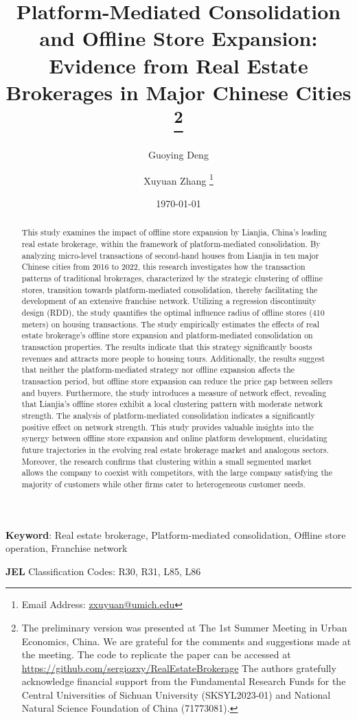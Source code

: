 \documentclass[11pt]{article}
\title{ \vspace*{-2.5cm} \hspace*{-0.5cm}Platform-Mediated Consolidation and Offline Store Expansion: Evidence from Real Estate Brokerages in Major Chinese Cities \footnote{
The preliminary version was presented at The 1st Summer Meeting in Urban Economics, China. We are grateful for the comments and suggestions made at the meeting. The code to replicate the paper can be accessed at \href{https://github.com/sergiozxy/RealEstateBrokerage}{https://github.com/sergiozxy/RealEstateBrokerage} The authors gratefully acknowledge financial support from the Fundamental Research Funds for the Central Universities of Sichuan University (SKSYL2023-01) and National Natural Science Foundation of China (71773081). %
}}
\date{ \vspace*{0.5cm} \today}
\begin{document}
\author[1]{Guoying Deng}
\author[2]{Xuyuan Zhang \thanks{Email Address: \href{mailto:zxuyuan@umich.edu}{zxuyuan@umich.edu}}}

\bgroup
\let\footnoterule\relax

\begin{singlespace}
\maketitle

\begin{abstract}
    \noindent This study examines the impact of offline store expansion by Lianjia, China's leading real estate brokerage, within the framework of platform-mediated consolidation. By analyzing micro-level transactions of second-hand houses from Lianjia in ten major Chinese cities from 2016 to 2022, this research investigates how the transaction patterns of traditional brokerages, characterized by the strategic clustering of offline stores, transition towards platform-mediated consolidation, thereby facilitating the development of an extensive franchise network. Utilizing a regression discontinuity design (RDD), the study quantifies the optimal influence radius of offline stores (410 meters) on housing transactions. The study empirically estimates the effects of real estate brokerage's offline store expansion and platform-mediated consolidation on transaction properties. The results indicate that this strategy significantly boosts revenues and attracts more people to housing tours. Additionally, the results suggest that neither the platform-mediated strategy nor offline expansion affects the transaction period, but offline store expansion can reduce the price gap between sellers and buyers. Furthermore, the study introduces a measure of network effect, revealing that Lianjia's offline stores exhibit a local clustering pattern with moderate network strength. The analysis of platform-mediated consolidation indicates a significantly positive effect on network strength. This study provides valuable insights into the synergy between offline store expansion and online platform development, elucidating future trajectories in the evolving real estate brokerage market and analogous sectors. Moreover, the research confirms that clustering within a small segmented market allows the company to coexist with competitors, with the large company satisfying the majority of customers while other firms cater to heterogeneous customer needs.
  \end{abstract}
  
  \textbf{Keyword}: Real estate brokerage, Platform-mediated consolidation, Offline store operation, Franchise network
  
  \textbf{JEL} Classification Codes: R30, R31, L85, L86
\end{singlespace}
\thispagestyle{empty}
\end{document}
